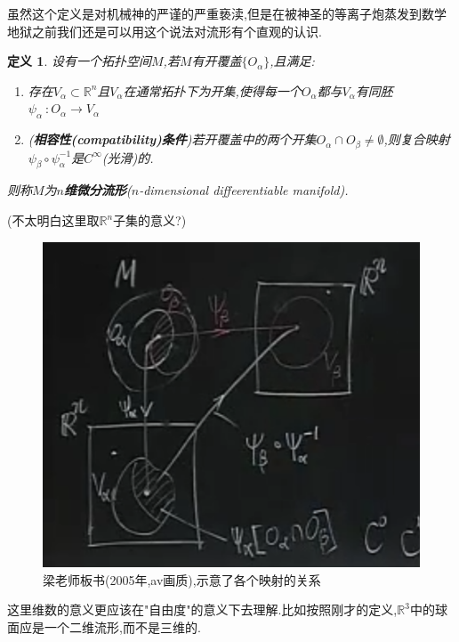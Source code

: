 \documentclass[UTF8]{article}
\begin{document}
	虽然这个定义是对机械神的严谨的严重亵渎,但是在被神圣的等离子炮蒸发到数学地狱之前我们还是可以用这个说法对流形有个直观的认识.
	
	\newtheorem*{differentiableManifold}{定义}	
	
	\begin{differentiableManifold}
		
		设有一个拓扑空间$M$,若$M$有开覆盖$\{O_{\alpha}\}$,且满足:
		
		\begin{enumerate}
			
			\item 存在$V_{\alpha} \subset \mathbb{R}^n$且$V_{\alpha}$在通常拓扑下为开集,使得每一个$O_{\alpha}$都与$V_{\alpha}$有同胚$\psi_{\alpha}~:O_{\alpha} \to V_{\alpha}$
			
			\item (\textbf{相容性(compatibility)条件})若开覆盖中的两个开集$O_{\alpha} \cap O_{\beta} \ne \emptyset$,则复合映射$\psi_{\beta} \circ \psi_{\alpha}^{-1}$是$C^{\infty}$(光滑)的.
			
		\end{enumerate}
	
		则称$M$为\textbf{$n$维微分流形}($n$-dimensional diffeerentiable manifold).
		
	\end{differentiableManifold}
	
	(不太明白这里取$\mathbb{R}^n$子集的意义?)
	
	\begin{figure}[H]
		\centering
		\includegraphics[width=0.7\linewidth]{pics/QQ截图20210725215644}
		\caption{梁老师板书(2005年,av画质),示意了各个映射的关系}
		\label{fig:qq20210725215644}
	\end{figure}
	
	这里维数的意义更应该在"自由度"的意义下去理解.比如按照刚才的定义,$\mathbb{R}^3$中的球面应是一个二维流形,而不是三维的.
	
\end{document}
